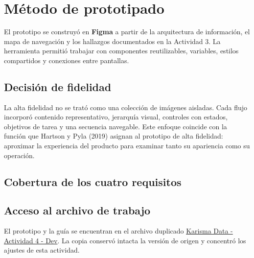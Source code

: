 \section{Método de prototipado}

El prototipo se construyó en \textbf{Figma} a partir de la arquitectura de información, el
mapa de navegación y los hallazgos documentados en la Actividad 3. La herramienta permitió
trabajar con componentes reutilizables, variables, estilos compartidos y conexiones entre
pantallas.

\subsection{Decisión de fidelidad}

La alta fidelidad no se trató como una colección de imágenes aisladas. Cada flujo incorporó
contenido representativo, jerarquía visual, controles con estados, objetivos de tarea y una
secuencia navegable. Este enfoque coincide con la función que Hartson y Pyla (2019) asignan al
prototipo de alta fidelidad: aproximar la experiencia del producto para examinar tanto su
apariencia como su operación.

\subsection{Cobertura de los cuatro requisitos}

\begin{uxlist}
\end{uxlist}

\subsection{Acceso al archivo de trabajo}

El prototipo y la guía se encuentran en el archivo duplicado
\href{https://www.figma.com/design/4RA9Q606HpPNveRruoHr7t/Karisma-Data---Actividad-4--Dev?node-id=0-1}{Karisma Data - Actividad 4 - Dev}.
La copia conservó intacta la versión de origen y concentró los ajustes de esta actividad.
